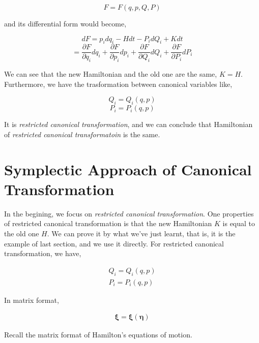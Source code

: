 \documentclass[12pt]{article}
\numberwithin{equation}{section}
\begin{document}
\begin{center}
    \[ F = F(q, p, Q, P) \]
\end{center}

and its differential form would become,

\begin{center}
    \[ dF = p_idq_i - Hdt - P_idQ_i + Kdt \]
    \[ = \frac{\partial F}{\partial q_i}dq_i + \frac{\partial F}{\partial p_i}dp_i + \frac{\partial F}{\partial Q_i}dQ_i + \frac{\partial F}{\partial P_i}dP_i \]
\end{center}

We can see that the new Hamiltonian and the old one are the same, $K = H$. Furthermore, we have the trasformation between canonical variables like,

\begin{center}
    \[ Q_i = Q_i(q, p) \]
    \[ P_i = P_i(q, p) \]
\end{center}

It is \textit{restricted canonical transformation}, and we can conclude that Hamiltonian of \textit{restricted canonical transformatoin} is the same.

\section{Symplectic Approach of Canonical Transformation}

In the begining, we focus on \textit{restricted canonical transformation}. One properties of restricted canonical transformation is that the new Hamiltonian $K$ is equal to the old one $H$. We can prove it by what we've just learnt, that is, it is the example of last section, and we use it directly. For restricted canonical transformation, we have,

\begin{equation}
    \begin{array}{l}
        Q_i = Q_i(q, p)\\
        P_i = P_i(q, p)
    \end{array}
\end{equation}

In matrix format,

\begin{equation}
    \begin{array}{l}
        \pmb{\xi} = \pmb{\xi}(\pmb{\eta})
    \end{array}
\end{equation}

Recall the matrix format of Hamilton's equations of motion.
\end{document}
